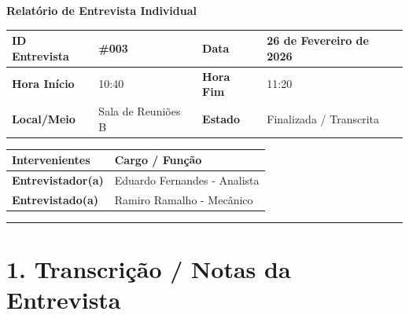 \documentclass[11pt,a4paper]{article}
\begin{document}
	
	{\noindent\LARGE\bfseries\color{primaryblue} Relatório de Entrevista Individual}
	\\[0.5cm]
	
	\renewcommand{\arraystretch}{1.5}
	\begin{tabularx}{\textwidth}{@{}|l|X|l|X|@{}}
		\hline
		\rowcolor{gray!10} \textbf{ID Entrevista} & \#003 & \textbf{Data} & 26 de Fevereiro de 2026 \\ \hline
		\textbf{Hora Início} & 10:40 & \textbf{Hora Fim} & 11:20 \\ \hline
		\textbf{Local/Meio} & Sala de Reuniões B & \textbf{Estado} & Finalizada / Transcrita \\ \hline
	\end{tabularx}
	
	\vspace{0.5cm}
	
	\begin{tabularx}{\textwidth}{@{}|l|X|@{}}
		\hline
		\rowcolor{gray!10} \textbf{Intervenientes} & \textbf{Cargo / Função} \\ \hline
		\textbf{Entrevistador(a)} & Eduardo Fernandes - Analista\\ \hline
		\textbf{Entrevistado(a)}  & Ramiro Ramalho - Mecânico \\ \hline
	\end{tabularx}
	
	\vspace{0.8cm}
	
	\hrule %
	\vspace{0.2cm}
	
	\section*{1. Transcrição / Notas da Entrevista}
	
\end{document}

